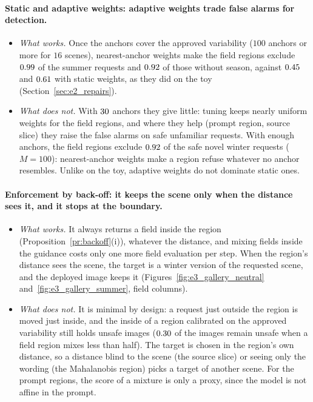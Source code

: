 \documentclass{article}
\theoremstyle{plain}
\theoremstyle{remark}
\begin{document}
\paragraph{Static and adaptive weights: adaptive weights trade false alarms for detection.}
\begin{itemize}
\item \emph{What works.} Once the anchors cover the approved variability ($100$ anchors or more for $16$ scenes), nearest-anchor
weights make the field regions exclude $0.99$ of the summer requests and $0.92$ of those without season, against
$0.45$ and $0.61$ with static weights, as they did on the toy (Section~\ref{sec:e2_repairs}).
\item \emph{What does not.} With $30$ anchors they give little: tuning keeps nearly uniform weights for the field regions, and
where they help (prompt region, source slice) they raise the false alarms on safe unfamiliar requests. With enough anchors, the field
regions exclude $0.92$ of the safe novel winter requests ($M=100$): nearest-anchor weights make a region refuse whatever no
anchor resembles. Unlike on the toy, adaptive weights do not dominate static ones.
\end{itemize}

\paragraph{Enforcement by back-off: it keeps the scene only when the distance sees it, and it stops at the boundary.}
\begin{itemize}
\item \emph{What works.} It always returns a field inside the region (Proposition~\ref{pr:backoff}(i)), whatever the distance, and
mixing fields inside the guidance costs only one more field evaluation per step. When the region's distance sees the scene, the target
is a winter version of the requested scene, and the deployed image keeps it (Figures~\ref{fig:e3_gallery_neutral}
and~\ref{fig:e3_gallery_summer}, field columns).
\item \emph{What does not.} It is minimal by design: a request just outside the region is moved just inside, and the inside of a
region calibrated on the approved variability still holds unsafe images ($0.30$ of the images remain unsafe when a field
region mixes less than half). The target is chosen in the region's own distance, so a distance blind to the scene (the source slice)
or seeing only the wording (the Mahalanobis region) picks a target of another scene. For the prompt regions, the score of a mixture
is only a proxy, since the model is not affine in the prompt.
\end{itemize}
\end{document}
